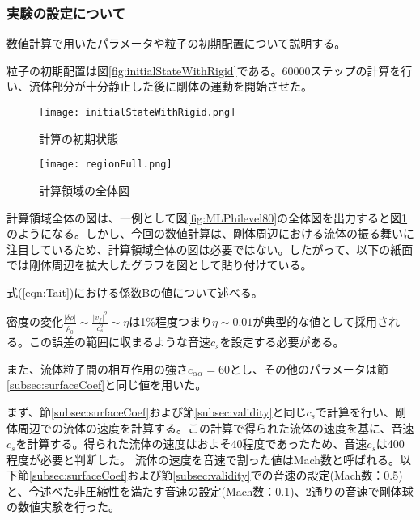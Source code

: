 \documentclass[]{jsarticle}
\begin{document}
\subsubsection{実験の設定について}
数値計算で用いたパラメータや粒子の初期配置について説明する。

粒子の初期配置は図\ref{fig:initialStateWithRigid}である。60000ステップの計算を行い、流体部分が十分静止した後に剛体の運動を開始させた。

\begin{figure}[H]
  \centering
  \begin{minipage}{0.4\columnwidth}
    \centering
    \texttt{[image: initialStateWithRigid.png]}
    \caption{計算の初期状態\label{fig:initialStateWithRigid} }
  \end{minipage}
    \begin{minipage}{0.5\columnwidth}
    \centering
    \texttt{[image: regionFull.png]}
\caption{計算領域の全体図\label{fig:regionFull}}
  \end{minipage}
\end{figure}



計算領域全体の図は、一例として図\ref{fig:MLPhilevel80}の全体図を出力すると図\ref{fig:regionFull}のようになる。しかし、今回の数値計算は、剛体周辺における流体の振る舞いに注目しているため、計算領域全体の図は必要ではない。したがって、以下の紙面では剛体周辺を拡大したグラフを図として貼り付けている。



式(\ref{eqn:Tait})における係数Bの値について述べる。

密度の変化$\frac{\left| \delta \rho \right|}{\rho_0}\sim \frac{\left| v_f \right|^2}{c_s^2}\sim\eta$は1\%程度つまり$\eta\sim 0.01$が典型的な値として採用される\cite{Becker2007}。この誤差の範囲に収まるような音速$c_s$を設定する必要がある。

また、流体粒子間の相互作用の強さ$c_{\alpha\alpha}=60$とし、その他のパラメータは節\ref{subsec:surfaceCoef}と同じ値を用いた。

まず、節\ref{subsec:surfaceCoef}および節\ref{subsec:validity}と同じ$c_s$で計算を行い、剛体周辺での流体の速度を計算する。この計算で得られた流体の速度を基に、音速$c_s$を計算する。得られた流体の速度はおよそ40程度であったため、音速$c_s$は400程度が必要と判断した。
流体の速度を音速で割った値はMach数と呼ばれる。以下節\ref{subsec:surfaceCoef}および節\ref{subsec:validity}での音速の設定(Mach数：0.5)と、今述べた非圧縮性を満たす音速の設定(Mach数：0.1)、2通りの音速で剛体球の数値実験を行った。
\end{document}
